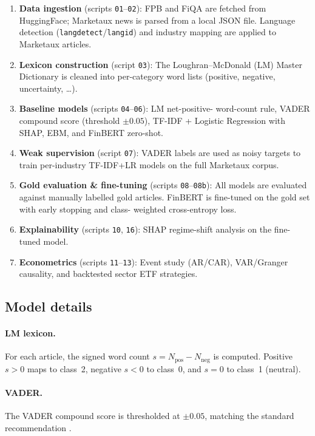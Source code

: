 \documentclass[11pt]{article}
\begin{document}
\begin{enumerate}
  \item \textbf{Data ingestion} (scripts \texttt{01}–\texttt{02}): FPB and FiQA are
    fetched from HuggingFace; Marketaux news is parsed from a local JSON file.
    Language detection (\texttt{langdetect}/\texttt{langid}) and industry
    mapping are applied to Marketaux articles.
  \item \textbf{Lexicon construction} (script \texttt{03}): The
    Loughran–McDonald (LM) Master Dictionary is cleaned into per-category word
    lists (positive, negative, uncertainty, \ldots).
  \item \textbf{Baseline models} (scripts \texttt{04}–\texttt{06}): LM net-positive-
    word-count rule, VADER compound score (threshold $\pm 0.05$), TF-IDF +
    Logistic Regression with SHAP, EBM, and FinBERT zero-shot.
  \item \textbf{Weak supervision} (script \texttt{07}): VADER labels are used as
    noisy targets to train per-industry TF-IDF+LR models on the full Marketaux
    corpus.
  \item \textbf{Gold evaluation \& fine-tuning} (scripts \texttt{08}–\texttt{08b}):
    All models are evaluated against manually labelled gold articles.
    FinBERT is fine-tuned on the gold set with early stopping and class-
    weighted cross-entropy loss.
  \item \textbf{Explainability} (scripts \texttt{10}, \texttt{16}): SHAP regime-shift
    analysis on the fine-tuned model.
  \item \textbf{Econometrics} (scripts \texttt{11}–\texttt{13}): Event study
    (AR/CAR), VAR/Granger causality, and backtested sector ETF strategies.
\end{enumerate}

\subsection{Model details}

\paragraph{LM lexicon.} For each article, the signed word count
$s = N_{\text{pos}} - N_{\text{neg}}$ is computed. Positive $s > 0$ maps to
class~2, negative $s < 0$ to class~0, and $s = 0$ to class~1 (neutral).

\paragraph{VADER.} The VADER compound score is thresholded at $\pm 0.05$,
matching the standard recommendation \cite{hutto2014vader}.
\end{document}
